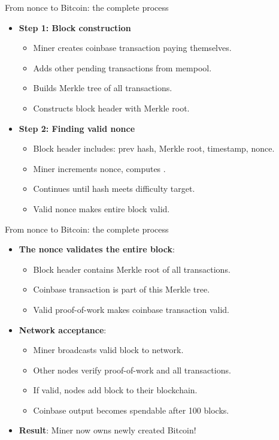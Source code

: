 \documentclass[aspectratio=169, lualatex, handout]{beamer}
\begin{document}
\begin{frame}{From nonce to Bitcoin: the complete process}
	\begin{itemize}
		\item \textbf{Step 1: Block construction}
		      \begin{itemize}
			      \item Miner creates coinbase transaction paying themselves.
			      \item Adds other pending transactions from mempool.
			      \item Builds Merkle tree of all transactions.
			      \item Constructs block header with Merkle root.
		      \end{itemize}
		\item \textbf{Step 2: Finding valid nonce}
		      \begin{itemize}
			      \item Block header includes: prev hash, Merkle root, timestamp, nonce.
			      \item Miner increments nonce, computes .
			      \item Continues until hash meets difficulty target.
			      \item Valid nonce makes entire block valid.
		      \end{itemize}
	\end{itemize}
\end{frame}

\begin{frame}{From nonce to Bitcoin: the complete process}
	\begin{itemize}
		\item \textbf{The nonce validates the entire block}:
		      \begin{itemize}
			      \item Block header contains Merkle root of all transactions.
			      \item Coinbase transaction is part of this Merkle tree.
			      \item Valid proof-of-work makes coinbase transaction valid.
		      \end{itemize}
		\item \textbf{Network acceptance}:
		      \begin{itemize}
			      \item Miner broadcasts valid block to network.
			      \item Other nodes verify proof-of-work and all transactions.
			      \item If valid, nodes add block to their blockchain.
			      \item Coinbase output becomes spendable after 100 blocks.
		      \end{itemize}
		\item \textbf{Result}: Miner now owns newly created Bitcoin!
	\end{itemize}
\end{frame}
\end{document}
